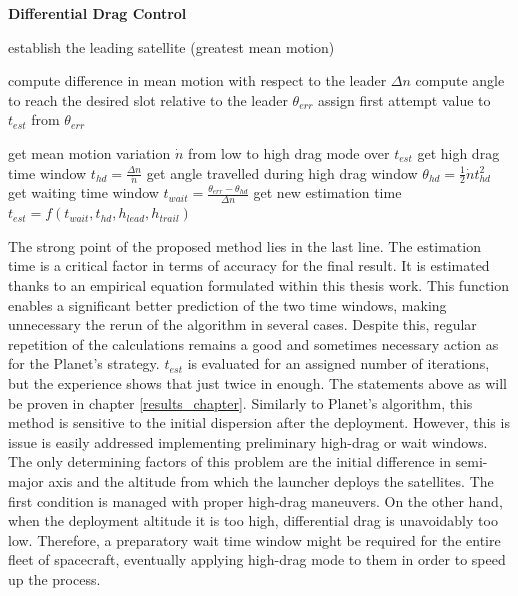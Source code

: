 \begin{algorithm}[H]
      \caption{\textbf{Differential Drag Control}}
      \begin{algorithmic}[1]

                  \State establish the leading satellite (greatest mean motion)


                  \State compute difference in mean motion with respect to the leader $\Delta n$
                  \State compute angle to reach the desired slot relative to the leader $\theta_{err}$ 
                  \State assign first attempt value to $t_{est}$ from $\theta_{err}$  
                                        
                              
                              \State get mean motion variation $\dot{n}$ from low to high drag mode over $t_{est}$
                              \State get high drag time window $t_{hd} = \frac{\Delta n}{\dot{n}}$
                              \State get angle travelled during high drag window $\theta_{hd} = \frac{1}{2}\dot{n}t_{hd}^2$
                              \State get waiting time window $t_{wait} = \frac{\theta_{err} - \theta_{hd}}{\Delta n}$
                              \State get new estimation time $t_{est} = f(t_{wait}, t_{hd}, h_{lead}, h_{trail})$ 
                        \EndFor
                  \EndFor
            \EndProcedure
      \end{algorithmic}
\end{algorithm}

The strong point of the proposed method lies in the last line.
The estimation time is a critical factor in terms of accuracy for the final result.
It is estimated thanks to an empirical equation formulated within this thesis work.
This function enables a significant better prediction of the two time windows, making unnecessary the rerun of the algorithm in several cases.
Despite this, regular repetition of the calculations remains a good and sometimes necessary action as for the Planet's strategy.
$t_{est}$ is evaluated for an assigned number of iterations, but the experience shows that just twice in enough.
The statements above as will be proven in chapter \ref{results_chapter}.
Similarly to Planet's algorithm, this method is sensitive to the initial dispersion after the deployment.
However, this is issue is easily addressed implementing preliminary high-drag or wait windows.
The only determining factors of this problem are the initial difference in semi-major axis and the altitude from which the launcher deploys the satellites.
The first condition is managed with proper high-drag maneuvers.
On the other hand, when the deployment altitude it is too high, differential drag is unavoidably too low.
Therefore, a preparatory wait time window might be required for the entire fleet of spacecraft, eventually applying high-drag mode to them in order to speed up the process.




